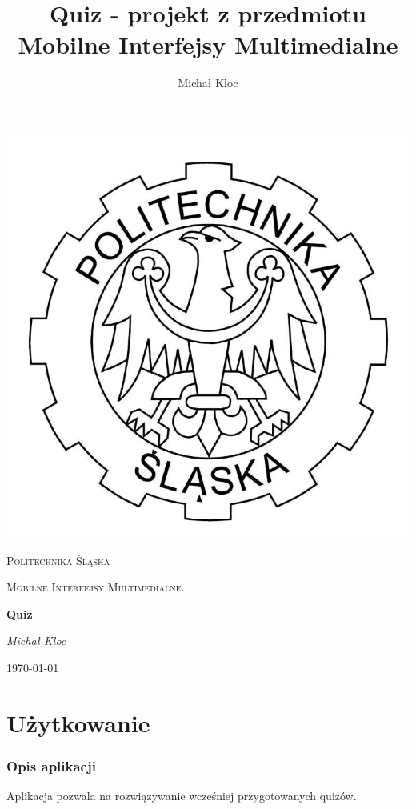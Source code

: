 \documentclass[12pt, a4paper]{article}
\title{Quiz - projekt z przedmiotu Mobilne Interfejsy Multimedialne}
\author{Michał Kloc}
\date{}
\begin{document}
\begin{titlepage}
	\centering
	\includegraphics[scale=0.2]{imgs/logo_polsl.jpg}\par\vspace{1cm}
	{\scshape\LARGE Politechnika Śląska \par}
	\vspace{1cm}
	{\scshape\Large Mobilne Interfejsy Multimedialne.\par}
	\vspace{1.5cm}
	{\huge\bfseries Quiz\par}
	\vspace{2cm}
	{\Large\itshape Michał Kloc\par}
	\vfill
	{\large \today\par}
\end{titlepage}

\tableofcontents
\setcounter{page}{0}
\newpage


\part{Użytkowanie}

\section{Opis aplikacji}
Aplikacja pozwala na rozwiązywanie wcześniej przygotowanych quizów.
\end{document}

